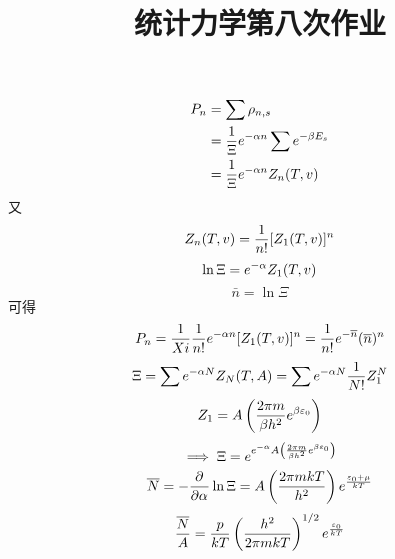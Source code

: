 \documentclass[UTF8,9pt]{ctexart}
\title{统计力学第八次作业}
\begin{document}
 
\maketitle
{}
$$\begin{aligned}  P_n &= \sum\rho_{n,s}\\
&= \frac{1}{\Xi}e^{-\alpha n}\sum e^{-\beta E_s}\\
&= \frac{1}{\Xi}e^{-\alpha n}Z_n(T,v)
 \end{aligned}$$
又
$$Z_n(T,v) = \frac{1}{n!}[Z_1(T,v)]^n$$
$$\ln\Xi = e^{-\alpha}Z_1(T,v)$$
$$\bar{n} = \ln\Xi$$
可得$$P_n=\frac{1}{Xi}\frac{1}{n!}e^{-\alpha n}[Z_1(T,v)]^n=\frac{1}{n!}e^{-\overline{n}}(\overline{n})^n$$
$$\Xi = \sum e^{-\alpha N}Z_N(T,A)= \sum e^{-\alpha N} \frac{1}{N!}Z_1^N$$
$$Z_1 = A\left( \frac{2\pi m}{\beta h^2}e^{\beta\varepsilon_0} \right)$$
$$\implies \Xi = e^{e^{-\alpha}A\left( \frac{2\pi m}{\beta h^2}e^{\beta\varepsilon_0} \right)}$$
$$\overline{N} = -\frac{\partial^{} }{\partial {\alpha}^{}}\ln\Xi=A\left( \frac{2\pi mkT}{h^2} \right)e^{\frac{\varepsilon_0+\mu}{kT}}$$
$$\frac{\overline{N}}{A} = \frac{p}{kT}\left( \frac{h^2}{2\pi mkT} \right)^{1/2}e^{\frac{\varepsilon_0}{kT}}$$
\end{document}

